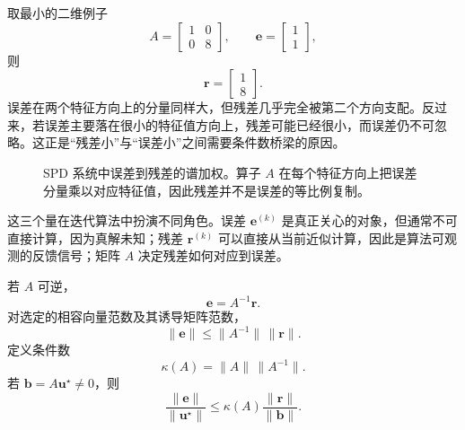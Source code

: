 取最小的二维例子
\begin{equation}
A=
\begin{bmatrix}
1&0\\
0&8
\end{bmatrix},
\qquad
\bm e=
\begin{bmatrix}
1\\1
\end{bmatrix},
\end{equation}
则
\begin{equation}
\bm r=
\begin{bmatrix}
1\\8
\end{bmatrix}.
\end{equation}
误差在两个特征方向上的分量同样大，但残差几乎完全被第二个方向支配。反过来，若误差主要落在很小的特征值方向上，残差可能已经很小，而误差仍不可忽略。这正是“残差小”与“误差小”之间需要条件数桥梁的原因。

\begin{figure}[htbp]
\centering
{}
\caption{SPD 系统中误差到残差的谱加权。算子 $A$ 在每个特征方向上把误差分量乘以对应特征值，因此残差并不是误差的等比例复制。}
\label{fig:linear-solvers-error-residual-spectrum}
\end{figure}

这三个量在迭代算法中扮演不同角色。误差 $\bm e^{(k)}$ 是真正关心的对象，但通常不可直接计算，因为真解未知；残差 $\bm r^{(k)}$ 可以直接从当前近似计算，因此是算法可观测的反馈信号；矩阵 $A$ 决定残差如何对应到误差。

若 $A$ 可逆，
\begin{equation}
\bm e=A^{-1}\bm r.
\end{equation}
对选定的相容向量范数及其诱导矩阵范数，
\begin{equation}
\|\bm e\|
\le
\|A^{-1}\|\,\|\bm r\|.
\end{equation}
定义条件数
\begin{equation}
\kappa(A)
=
\|A\|\,\|A^{-1}\|.
\label{eq:linear-solvers-condition-number}
\end{equation}
若 $\bm b=A\bm u^\star\neq0$，则
\begin{equation}
\frac{\|\bm e\|}{\|\bm u^\star\|}
\le
\kappa(A)
\frac{\|\bm r\|}{\|\bm b\|}.
\label{eq:linear-solvers-relative-bound}
\end{equation}

